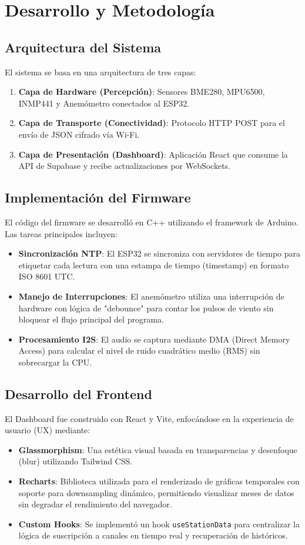 \chapter{Desarrollo y Metodología}

\section{Arquitectura del Sistema}
El sistema se basa en una arquitectura de tres capas:
\begin{enumerate}
    \item \textbf{Capa de Hardware (Percepción)}: Sensores BME280, MPU6500, INMP441 y Anemómetro conectados al ESP32.
    \item \textbf{Capa de Transporte (Conectividad)}: Protocolo HTTP POST para el envío de JSON cifrado vía Wi-Fi.
    \item \textbf{Capa de Presentación (Dashboard)}: Aplicación React que consume la API de Supabase y recibe actualizaciones por WebSockets.
\end{enumerate}

\section{Implementación del Firmware}
El código del firmware se desarrolló en C++ utilizando el framework de Arduino. Las tareas principales incluyen:
\begin{itemize}
    \item \textbf{Sincronización NTP}: El ESP32 se sincroniza con servidores de tiempo para etiquetar cada lectura con una estampa de tiempo (timestamp) en formato ISO 8601 UTC.
    \item \textbf{Manejo de Interrupciones}: El anemómetro utiliza una interrupción de hardware con lógica de "debounce" para contar los pulsos de viento sin bloquear el flujo principal del programa.
    \item \textbf{Procesamiento I2S}: El audio se captura mediante DMA (Direct Memory Access) para calcular el nivel de ruido cuadrático medio (RMS) sin sobrecargar la CPU.
\end{itemize}

\section{Desarrollo del Frontend}
El Dashboard fue construido con React y Vite, enfocándose en la experiencia de usuario (UX) mediante:
\begin{itemize}
    \item \textbf{Glassmorphism}: Una estética visual basada en transparencias y desenfoque (blur) utilizando Tailwind CSS.
    \item \textbf{Recharts}: Biblioteca utilizada para el renderizado de gráficas temporales con soporte para downsampling dinámico, permitiendo visualizar meses de datos sin degradar el rendimiento del navegador.
    \item \textbf{Custom Hooks}: Se implementó un hook \texttt{useStationData} para centralizar la lógica de suscripción a canales en tiempo real y recuperación de históricos.
\end{itemize}

